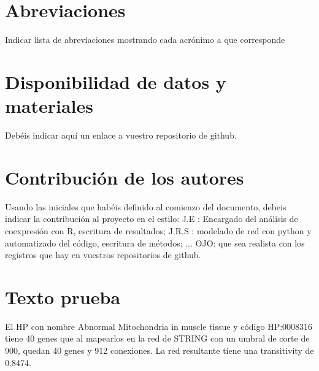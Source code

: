 \documentclass{bmcart}
\begin{document}
	\begin{backmatter}
	
		\section*{Abreviaciones}%
			Indicar lista de abreviaciones mostrando cada acrónimo a que corresponde
		
		\section*{Disponibilidad de datos y materiales}%
			Debéis indicar aquí un enlace a vuestro repositorio de github.
		
		\section*{Contribución de los autores}
			Usando las iniciales que habéis definido al comienzo del documento, debeis indicar la contribución al proyecto en el estilo:
			J.E : Encargado del análisis de coexpresión con R, escritura de resultados; J.R.S : modelado de red con python y automatizado del código, escritura de métodos; ...
			OJO: que sea realista con los registros que hay en vuestros repositorios de github. 
		
		
		
	
		\section *{Texto prueba}
		El HP con nombre Abnormal Mitochondria in muscle tissue y código HP:0008316 tiene 40 genes que al mapearlos en la red de STRING \cite{Szklarczyk2011} con un umbral de corte de 900, quedan 40 genes y 912 conexiones. La red resultante tiene una transitivity de 0.8474. 
		
		
	\end{backmatter}
\end{document}
